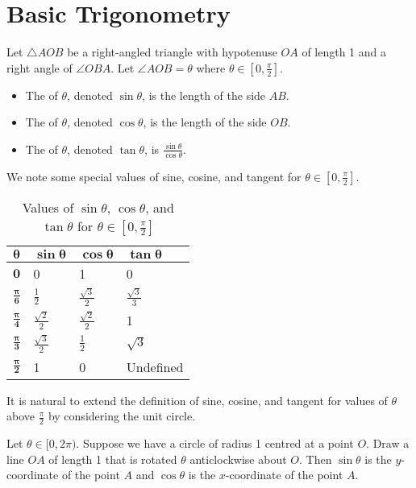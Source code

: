 \section{Basic Trigonometry}
\begin{definition}
    Let $\triangle AOB$ be a right-angled triangle with hypotenuse $OA$ of length 1 and a right angle of $\angle OBA$. Let $\angle AOB = \theta$ where $\theta \in [0, \frac\pi2]$.
    \begin{itemize}
        \item The  of $\theta$, denoted $\sin\theta$, is the length of the side $AB$.
        \item The  of $\theta$, denoted $\cos\theta$, is the length of the side $OB$.
        \item The  of $\theta$, denoted $\tan\theta$, is $\frac{\sin\theta}{\cos\theta}$.
    \end{itemize}
\end{definition}

We note some special values of sine, cosine, and tangent for $\theta \in [0, \frac\pi2]$.

\begin{table}[H]
    \centering
    \begin{tabular}{|l|l|l|l|}
        \hline
        $\boldsymbol{\theta}$ & $\boldsymbol{\sin\theta}$ & $\boldsymbol{\cos\theta}$ & $\boldsymbol{\tan\theta}$ \\ \hline
        $\boldsymbol{0}$ & 0 & 1 & 0 \\ \hline
        $\boldsymbol{\frac\pi6}$ & $\frac12$ & $\frac{\sqrt3}2$ & $\frac{\sqrt3}3$ \\ \hline
        $\boldsymbol{\frac\pi4}$ & $\frac{\sqrt2}2$ & $\frac{\sqrt2}2$ & 1 \\ \hline
        $\boldsymbol{\frac\pi3}$ & $\frac{\sqrt3}2$ & $\frac12$ & $\sqrt3$ \\ \hline
        $\boldsymbol{\frac\pi2}$ & 1 & 0 & Undefined \\ \hline
    \end{tabular}
    \caption{Values of $\sin\theta$, $\cos\theta$, and $\tan\theta$ for $\theta \in [0, \frac\pi2]$}
\end{table}

It is natural to extend the definition of sine, cosine, and tangent for values of $\theta$ above $\frac\pi2$ by considering the unit circle.

\begin{definition}
    Let $\theta \in [0, 2\pi)$. Suppose we have a circle of radius 1 centred at a point $O$. Draw a line $OA$ of length 1 that is rotated $\theta$ anticlockwise about $O$. Then $\sin\theta$ is the $y$-coordinate of the point $A$ and  $\cos\theta$ is the $x$-coordinate of the point $A$.
\end{definition}


